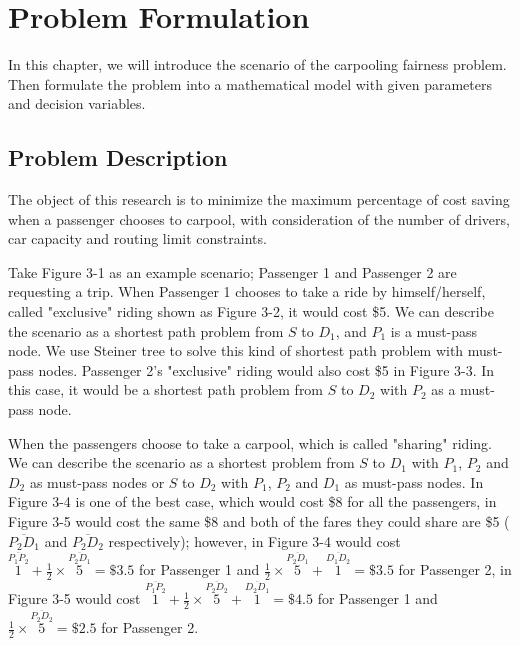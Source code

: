 
\chapter{Problem Formulation}

In this chapter, we will introduce the scenario of the carpooling fairness problem. Then formulate the problem into a mathematical model with given parameters and decision variables.

\section{Problem Description}

The object of this research is to minimize the maximum percentage of cost saving when a passenger chooses to carpool, with consideration of the number of drivers, car capacity and routing limit constraints.

Take Figure 3-1 as an example scenario; Passenger 1 and Passenger 2 are requesting a trip. When Passenger 1 chooses to take a ride by himself/herself, called "exclusive" riding shown as Figure 3-2, it would cost \$5. We can describe the scenario as a shortest path problem from $S$ to $D_1$, and $P_1$ is a must-pass node. We use Steiner tree to solve this kind of shortest path problem with must-pass nodes. Passenger 2's "exclusive" riding would also cost \$5 in Figure 3-3. In this case, it would be a shortest path problem from $S$ to $D_2$ with $P_2$ as a must-pass node.

When the passengers choose to take a carpool, which is called "sharing" riding. We can describe the scenario as a shortest problem from $S$ to $D_1$ with $P_1$, $P_2$ and $D_2$ as must-pass nodes or $S$ to $D_2$ with $P_1$, $P_2$ and $D_1$ as must-pass nodes. In Figure 3-4 is one of the best case, which would cost \$8 for all the passengers, in Figure 3-5 would cost the same \$8 and both of the fares they could share are \$5 ( $\overline{P_2D_1}$ and $\overline{P_2D_2}$ respectively); however, in Figure 3-4 would cost $\overset{\overline{P_1P_2}}{1} + \frac{1}{2} \times \overset{\overline{P_2D_1}}{5} = \$3.5$ for Passenger 1 and $\frac{1}{2} \times \overset{\overline{P_2D_1}}{5} + \overset{\overline{D_1D_2}}{1} = \$3.5$ for Passenger 2, in Figure 3-5 would cost $\overset{\overline{P_1P_2}}{1} + \frac{1}{2} \times \overset{\overline{P_2D_2}}{5} + \overset{\overline{D_2D_1}}{1} = \$4.5$ for Passenger 1 and $\frac{1}{2} \times \overset{\overline{P_2D_2}}{5} = \$2.5$ for Passenger 2.

